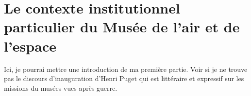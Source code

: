 \documentclass[12pt,twoside]{book}
\begin{document}
	
	
	
	
	\nocite{*}
	
	
	\newpage{\pagestyle{empty}\cleardoublepage}
	
	
	\mainmatter
	
	
	\part{Le contexte institutionnel particulier du Musée de l'air et de l'espace}
	
	
	Ici, je pourrai mettre une introduction de ma première partie.
	Voir si je ne trouve pas le discours d'inauguration d'Henri Puget qui est littéraire et expressif sur les missions du musées vues après guerre.
	
	
	 
	
	
	
\end{document}
